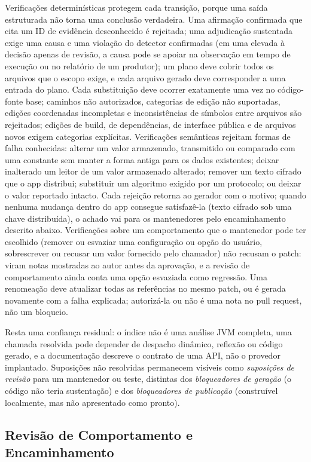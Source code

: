 \documentclass[conference]{IEEEtran}
\begin{document}
Verificações determinísticas protegem cada transição, porque uma saída
estruturada não torna uma conclusão verdadeira. Uma afirmação confirmada que
cita um ID de evidência desconhecido é rejeitada; uma adjudicação sustentada
exige uma causa e uma violação do detector confirmadas (em uma elevada à
decisão apenas de revisão, a causa pode se apoiar na observação em tempo de
execução ou no relatório de um produtor); um plano deve cobrir
todos os arquivos que o escopo exige, e cada arquivo gerado deve corresponder a
uma entrada do plano. Cada substituição deve ocorrer exatamente uma vez no
código-fonte base; caminhos não autorizados, categorias de edição não
suportadas, edições coordenadas incompletas e inconsistências de símbolos entre
arquivos são rejeitados; edições de build, de dependências, de interface
pública e de arquivos novos exigem categorias explícitas. Verificações
semânticas rejeitam formas de falha conhecidas: alterar um valor armazenado,
transmitido ou comparado com uma constante sem manter a forma antiga para os
dados existentes; deixar inalterado um leitor de um valor armazenado alterado;
remover um texto cifrado que o app distribui; substituir um algoritmo exigido
por um protocolo; ou deixar o valor reportado intacto. Cada rejeição retorna ao
gerador com o motivo; quando nenhuma mudança dentro do app consegue satisfazê-la
(texto cifrado sob uma chave distribuída), o achado vai para os mantenedores
pelo encaminhamento descrito abaixo. Verificações sobre um comportamento que o
mantenedor pode ter escolhido (remover ou esvaziar uma configuração ou opção do
usuário, sobrescrever ou recusar um valor fornecido pelo chamador) não recusam o
patch: viram notas mostradas ao autor antes da aprovação, e a revisão de
comportamento ainda conta uma opção esvaziada como regressão. Uma
renomeação deve atualizar todas as referências no mesmo patch, ou é gerada
novamente com a falha explicada; autorizá-la ou não é uma nota no pull request,
não um bloqueio.

Resta uma confiança residual: o índice não é uma análise JVM completa, uma chamada resolvida
pode depender de despacho dinâmico, reflexão ou código gerado, e a documentação
descreve o contrato de uma API, não o provedor implantado. Suposições não
resolvidas permanecem visíveis como \emph{suposições de revisão} para um
mantenedor ou teste, distintas dos \emph{bloqueadores de geração} (o código não
teria sustentação) e dos \emph{bloqueadores de publicação} (construível
localmente, mas não apresentado como pronto).

\subsection{Revisão de Comportamento e Encaminhamento}
\end{document}

